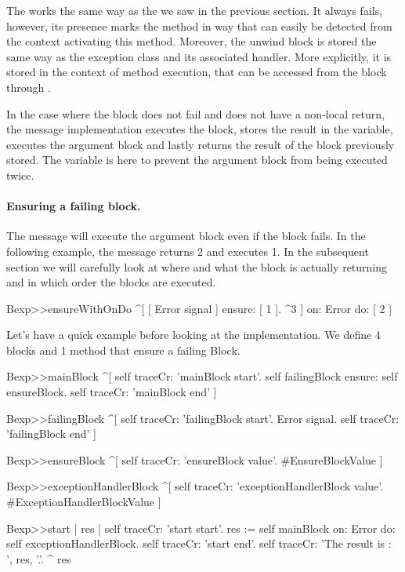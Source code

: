 The  works the same way as the  we saw in the previous section. It always fails, however, its presence marks the method in way that can easily be detected from the context activating this method. Moreover, the unwind block is stored the same way as the exception class and its associated handler. More explicitly, it is stored in the context of 
method execution, that can be accessed from the block through  .

In the case where the block does not fail and does not have a non-local return, the  message implementation executes the block, stores the result in the  variable, executes the argument block and lastly returns the result of the block previously stored. 
The  variable is here to prevent  the argument block from being executed twice. 

\paragraph{Ensuring a failing block.}

The  message will execute the argument block even if the block fails. In the following example, the  message  returns 2 and executes 1. In the subsequent section we will carefully look at where and what the block is actually returning and in which order  the blocks are executed. 

\begin{code}{}
Bexp>>ensureWithOnDo
	^[ [ Error signal ] ensure: [ 1 ]. 
	   ^3 ] on: Error do: [ 2 ]
\end{code}

Let's have a quick example before looking at the implementation. We define 4 blocks and 1 method that ensure a failing Block.
\begin{code}{}
Bexp>>mainBlock 
	^[ self traceCr: 'mainBlock start'. 
	 self failingBlock ensure: self ensureBlock.
	 self traceCr: 'mainBlock end' ]

Bexp>>failingBlock 
	^[ self traceCr: 'failingBlock start'. 
	 Error signal.
	 self traceCr: 'failingBlock end' ]

Bexp>>ensureBlock 
	^[ self traceCr: 'ensureBlock value'. 
	 #EnsureBlockValue ]

Bexp>>exceptionHandlerBlock 
	^[ self traceCr: 'exceptionHandlerBlock value'. 
	   #ExceptionHandlerBlockValue ] 

Bexp>>start 
	| res |
	self traceCr: 'start start'. 
	res := self mainBlock on: Error do: self exceptionHandlerBlock. 
	self traceCr: 'start end'. 
	self traceCr: 'The result is : ', res, '.'.
	^ res
\end{code}

